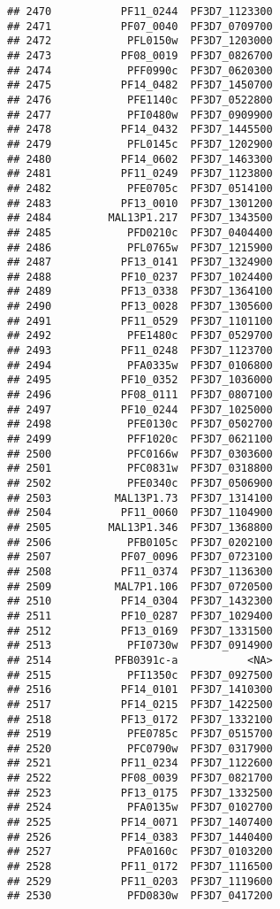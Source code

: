 \documentclass[12pt, a4paper]{article}\usepackage[]{graphicx}\usepackage[]{color}
\makeatletter
\newenvironment{kframe}{%
 \def\at@end@of@kframe{}%
 \ifinner\ifhmode%
  \def\at@end@of@kframe{\end{minipage}}%
  \begin{minipage}{\columnwidth}%
 \fi\fi%
 \def\FrameCommand##1{\hskip\@totalleftmargin \hskip-\fboxsep
 \colorbox{shadecolor}{##1}\hskip-\fboxsep
     \hskip-\linewidth \hskip-\@totalleftmargin \hskip\columnwidth}%
 \MakeFramed {\advance\hsize-\width
   \@totalleftmargin\z@ \linewidth\hsize
   \@setminipage}}%
 {\par\unskip\endMakeFramed%
 \at@end@of@kframe}
\newenvironment{knitrout}{}{} %
\makeatother
\begin{document}
\begin{knitrout}
\begin{kframe}
\begin{verbatim}
## 2470           PF11_0244  PF3D7_1123300
## 2471           PF07_0040  PF3D7_0709700
## 2472            PFL0150w  PF3D7_1203000
## 2473           PF08_0019  PF3D7_0826700
## 2474            PFF0990c  PF3D7_0620300
## 2475           PF14_0482  PF3D7_1450700
## 2476            PFE1140c  PF3D7_0522800
## 2477            PFI0480w  PF3D7_0909900
## 2478           PF14_0432  PF3D7_1445500
## 2479            PFL0145c  PF3D7_1202900
## 2480           PF14_0602  PF3D7_1463300
## 2481           PF11_0249  PF3D7_1123800
## 2482            PFE0705c  PF3D7_0514100
## 2483           PF13_0010  PF3D7_1301200
## 2484         MAL13P1.217  PF3D7_1343500
## 2485            PFD0210c  PF3D7_0404400
## 2486            PFL0765w  PF3D7_1215900
## 2487           PF13_0141  PF3D7_1324900
## 2488           PF10_0237  PF3D7_1024400
## 2489           PF13_0338  PF3D7_1364100
## 2490           PF13_0028  PF3D7_1305600
## 2491           PF11_0529  PF3D7_1101100
## 2492            PFE1480c  PF3D7_0529700
## 2493           PF11_0248  PF3D7_1123700
## 2494            PFA0335w  PF3D7_0106800
## 2495           PF10_0352  PF3D7_1036000
## 2496           PF08_0111  PF3D7_0807100
## 2497           PF10_0244  PF3D7_1025000
## 2498            PFE0130c  PF3D7_0502700
## 2499            PFF1020c  PF3D7_0621100
## 2500            PFC0166w  PF3D7_0303600
## 2501            PFC0831w  PF3D7_0318800
## 2502            PFE0340c  PF3D7_0506900
## 2503          MAL13P1.73  PF3D7_1314100
## 2504           PF11_0060  PF3D7_1104900
## 2505         MAL13P1.346  PF3D7_1368800
## 2506            PFB0105c  PF3D7_0202100
## 2507           PF07_0096  PF3D7_0723100
## 2508           PF11_0374  PF3D7_1136300
## 2509          MAL7P1.106  PF3D7_0720500
## 2510           PF14_0304  PF3D7_1432300
## 2511           PF10_0287  PF3D7_1029400
## 2512           PF13_0169  PF3D7_1331500
## 2513            PFI0730w  PF3D7_0914900
## 2514          PFB0391c-a           <NA>
## 2515            PFI1350c  PF3D7_0927500
## 2516           PF14_0101  PF3D7_1410300
## 2517           PF14_0215  PF3D7_1422500
## 2518           PF13_0172  PF3D7_1332100
## 2519            PFE0785c  PF3D7_0515700
## 2520            PFC0790w  PF3D7_0317900
## 2521           PF11_0234  PF3D7_1122600
## 2522           PF08_0039  PF3D7_0821700
## 2523           PF13_0175  PF3D7_1332500
## 2524            PFA0135w  PF3D7_0102700
## 2525           PF14_0071  PF3D7_1407400
## 2526           PF14_0383  PF3D7_1440400
## 2527            PFA0160c  PF3D7_0103200
## 2528           PF11_0172  PF3D7_1116500
## 2529           PF11_0203  PF3D7_1119600
## 2530            PFD0830w  PF3D7_0417200

\end{verbatim}
\end{kframe}
\end{knitrout}
\end{document}
